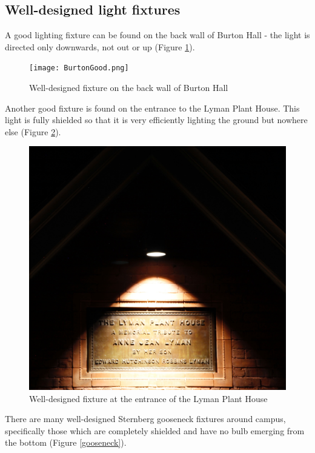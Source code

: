 \documentclass[12pt, oneside]{article}
\begin{document}
\subsection{Well-designed light fixtures}
A good lighting fixture can be found on the back wall of Burton Hall - the light is directed only downwards, not out or up (Figure \ref{burtongood}).
 \begin{figure}[p]
	\centering
	\texttt{[image: BurtonGood.png]}
	\caption[Light on Burton Hall]{Well-designed fixture on the back wall of Burton Hall}
	\label{burtongood}
\end{figure}
Another good fixture is found on the entrance to the Lyman Plant House. This light is fully shielded so that it is very efficiently lighting the ground but nowhere else (Figure \ref{Lyman}).
 \begin{figure}[p]
	\centering
	\includegraphics[width=.5\textwidth]{Lyman.jpg}
	\caption[Light on Lyman Plant House]{Well-designed fixture at the entrance of the Lyman Plant House}
	\label{Lyman}
\end{figure}
There are many well-designed Sternberg gooseneck fixtures around campus, specifically those which are completely shielded and have no bulb emerging from the bottom (Figure \ref{gooseneck}).
\end{document}
